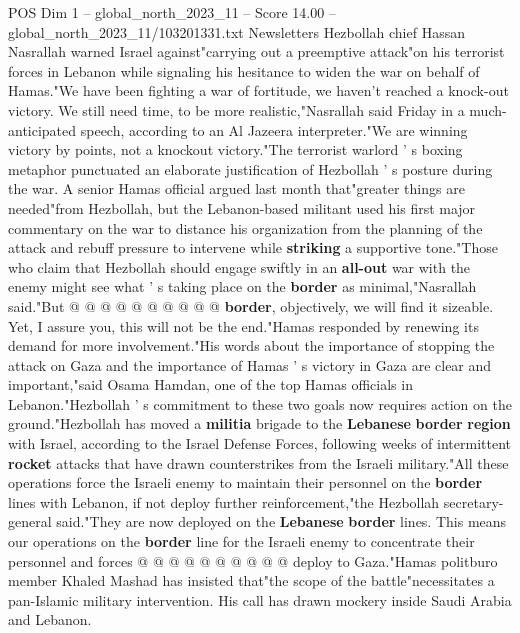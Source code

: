\begin{textsample}{POS Dim 1 – global\_north\_2023\_11 – Score 14.00 – global\_north\_2023\_11/103201331.txt}  \label{ex:f1_pos_359}
Newsletters Hezbollah chief Hassan Nasrallah warned Israel against"carrying out a preemptive attack"on his terrorist forces in Lebanon while signaling his hesitance to widen the war on behalf of Hamas."We have been fighting a war of fortitude, we haven't reached a knock-out victory.
We still need time, to be more realistic,"Nasrallah said Friday in a much-anticipated speech, according to an Al Jazeera interpreter."We are winning victory by points, not a knockout victory."The terrorist warlord ' s boxing metaphor punctuated an elaborate justification of Hezbollah ' s posture during the war.
A senior Hamas official argued last month that"greater things are needed"from Hezbollah, but the Lebanon-based militant used his first major commentary on the war to distance his organization from the planning of the attack and rebuff pressure to intervene while \textbf{striking} a supportive tone."Those who claim that Hezbollah should engage swiftly in an \textbf{all-out} war with the enemy might see what ' s taking place on the \textbf{border} as minimal,"Nasrallah said."But @ @ @ @ @ @ @ @ @ @ \textbf{border}, objectively, we will find it sizeable.
Yet, I assure you, this will not be the end."Hamas responded by renewing its demand for more involvement."His words about the importance of stopping the attack on Gaza and the importance of Hamas ' s victory in Gaza are clear and important,"said Osama Hamdan, one of the top Hamas officials in Lebanon."Hezbollah ' s commitment to these two goals now requires action on the ground."Hezbollah has moved a \textbf{militia} brigade to the \textbf{Lebanese} \textbf{border} \textbf{region} with Israel, according to the Israel Defense Forces, following weeks of intermittent \textbf{rocket} attacks that have drawn counterstrikes from the Israeli military."All these operations force the Israeli enemy to maintain their personnel on the \textbf{border} lines with Lebanon, if not deploy further reinforcement,"the Hezbollah secretary-general said."They are now deployed on the \textbf{Lebanese} \textbf{border} lines.
This means our operations on the \textbf{border} line for the Israeli enemy to concentrate their personnel and forces @ @ @ @ @ @ @ @ @ @ deploy to Gaza."Hamas politburo member Khaled Mashad has insisted that"the scope of the battle"necessitates a pan-Islamic military intervention.
His call has drawn mockery inside Saudi Arabia and Lebanon.

\end{textsample}
